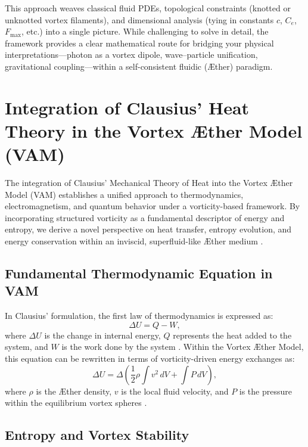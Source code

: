 \documentclass[a4paper,12pt]{article}
\begin{document}
This approach weaves classical fluid PDEs, topological constraints (knotted or unknotted vortex filaments), and dimensional analysis (tying in constants \(c\), \(C_e\), \(F_{\max}\), etc.) into a single picture. While challenging to solve in detail, the framework provides a clear mathematical route for bridging your physical interpretations—photon as a vortex dipole, wave–particle unification, gravitational coupling—within a self-consistent fluidic (Æther) paradigm.

    \section{Integration of Clausius' Heat Theory in the Vortex Æther Model (VAM)}

    The integration of Clausius' Mechanical Theory of Heat into the Vortex Æther Model (VAM) establishes a unified approach to thermodynamics, electromagnetism, and quantum behavior under a vorticity-based framework. By incorporating structured vorticity as a fundamental descriptor of energy and entropy, we derive a novel perspective on heat transfer, entropy evolution, and energy conservation within an inviscid, superfluid-like Æther medium \cite{clausius1865mechanical, maxwell1865electromagnetic, helmholtz1858integrals}.

    \subsection{Fundamental Thermodynamic Equation in VAM}

    In Clausius' formulation, the first law of thermodynamics is expressed as:
    \begin{equation}
        \Delta U = Q - W,
    \end{equation}
    where $\Delta U$ is the change in internal energy, $Q$ represents the heat added to the system, and $W$ is the work done by the system \cite{clausius1865mechanical}. Within the Vortex Æther Model, this equation can be rewritten in terms of vorticity-driven energy exchanges as:
    \begin{equation}
        \Delta U = \Delta \left( \frac{1}{2} \rho \int v^2 \, dV + \int P \, dV \right),
    \end{equation}
    where $\rho$ is the Æther density, $v$ is the local fluid velocity, and $P$ is the pressure within the equilibrium vortex spheres \cite{vam2025unified}.

    \subsection{Entropy and Vortex Stability}
\end{document}
